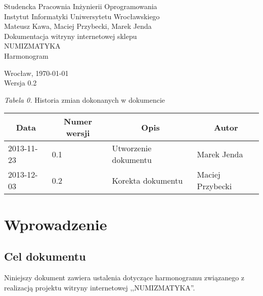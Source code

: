 \documentclass 	[11pt, a4paper, leqno]	{article}					%
\begin{document}

\begin{center}
	\thispagestyle{empty} 							%
	{\large Studencka Pracownia Inżynierii Oprogramowania} 		\\ [0.5cm]
	{\large Instytut Informatyki Uniwersytetu Wrocławskiego} 	\\ [6.0cm]

	{\large Mateusz Kawa, Maciej Przybecki, Marek Jenda} 		\\ [1.5cm]

	{\huge Dokumentacja witryny internetowej sklepu} 			\\ [0.5cm]
	{\huge NUMIZMATYKA} 										\\ [1.5cm]

	{\large Harmonogram} 										\\ [0.5cm]

	\vfill
	
	{\large Wrocław, \today}									\\ [0.5cm]
	{\large Wersja 0.2}
\end{center}

\newpage


\textit{Tabela 0.} Historia zmian dokonanych w dokumencie

\begin{center}
	\begin{tabular}{| l | l | l | l |}
		\hline
		\multicolumn{1}{|c|}{Data} & 
		\multicolumn{1}{|c|}{Numer wersji} &  
		\multicolumn{1}{|c|}{Opis} &
		\multicolumn{1}{|c|}{Autor} \\ \hline \hline
		2013-11-23 & 0.1 & Utworzenie dokumentu & Marek Jenda \\ \hline
		2013-12-03 & 0.2 & Korekta dokumentu  & Maciej Przybecki \\ \hline
	\end{tabular}
\end{center}

\medskip


\tableofcontents

\newpage

\section{Wprowadzenie}

\subsection{Cel dokumentu}
\noindent
Niniejszy dokument zawiera ustalenia dotyczące harmonogramu związanego z realizacją projektu witryny internetowej ,,NUMIZMATYKA''.
\end{document}

